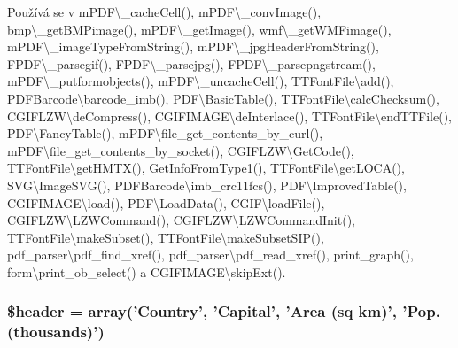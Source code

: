 Používá se v m\-P\-D\-F\textbackslash{}\-\_\-cache\-Cell(), m\-P\-D\-F\textbackslash{}\-\_\-conv\-Image(), bmp\textbackslash{}\-\_\-get\-B\-M\-Pimage(), m\-P\-D\-F\textbackslash{}\-\_\-get\-Image(), wmf\textbackslash{}\-\_\-get\-W\-M\-Fimage(), m\-P\-D\-F\textbackslash{}\-\_\-image\-Type\-From\-String(), m\-P\-D\-F\textbackslash{}\-\_\-jpg\-Header\-From\-String(), F\-P\-D\-F\textbackslash{}\-\_\-parsegif(), F\-P\-D\-F\textbackslash{}\-\_\-parsejpg(), F\-P\-D\-F\textbackslash{}\-\_\-parsepngstream(), m\-P\-D\-F\textbackslash{}\-\_\-putformobjects(), m\-P\-D\-F\textbackslash{}\-\_\-uncache\-Cell(), T\-T\-Font\-File\textbackslash{}add(), P\-D\-F\-Barcode\textbackslash{}barcode\-\_\-imb(), P\-D\-F\textbackslash{}\-Basic\-Table(), T\-T\-Font\-File\textbackslash{}calc\-Checksum(), C\-G\-I\-F\-L\-Z\-W\textbackslash{}de\-Compress(), C\-G\-I\-F\-I\-M\-A\-G\-E\textbackslash{}de\-Interlace(), T\-T\-Font\-File\textbackslash{}end\-T\-T\-File(), P\-D\-F\textbackslash{}\-Fancy\-Table(), m\-P\-D\-F\textbackslash{}file\-\_\-get\-\_\-contents\-\_\-by\-\_\-curl(), m\-P\-D\-F\textbackslash{}file\-\_\-get\-\_\-contents\-\_\-by\-\_\-socket(), C\-G\-I\-F\-L\-Z\-W\textbackslash{}\-Get\-Code(), T\-T\-Font\-File\textbackslash{}get\-H\-M\-T\-X(), Get\-Info\-From\-Type1(), T\-T\-Font\-File\textbackslash{}get\-L\-O\-C\-A(), S\-V\-G\textbackslash{}\-Image\-S\-V\-G(), P\-D\-F\-Barcode\textbackslash{}imb\-\_\-crc11fcs(), P\-D\-F\textbackslash{}\-Improved\-Table(), C\-G\-I\-F\-I\-M\-A\-G\-E\textbackslash{}load(), P\-D\-F\textbackslash{}\-Load\-Data(), C\-G\-I\-F\textbackslash{}load\-File(), C\-G\-I\-F\-L\-Z\-W\textbackslash{}\-L\-Z\-W\-Command(), C\-G\-I\-F\-L\-Z\-W\textbackslash{}\-L\-Z\-W\-Command\-Init(), T\-T\-Font\-File\textbackslash{}make\-Subset(), T\-T\-Font\-File\textbackslash{}make\-Subset\-S\-I\-P(), pdf\-\_\-parser\textbackslash{}pdf\-\_\-find\-\_\-xref(), pdf\-\_\-parser\textbackslash{}pdf\-\_\-read\-\_\-xref(), print\-\_\-graph(), form\textbackslash{}print\-\_\-ob\-\_\-select() a C\-G\-I\-F\-I\-M\-A\-G\-E\textbackslash{}skip\-Ext().

\hypertarget{tuto5_8php_a4f44601f2b9dc8a1644bce53c94ce622}{
\subsubsection[{\$header}]{\setlength{\rightskip}{0pt plus 5cm}\$header = array('Country', 'Capital', 'Area (sq km)', 'Pop. (thousands)')}}\label{tuto5_8php_a4f44601f2b9dc8a1644bce53c94ce622}


